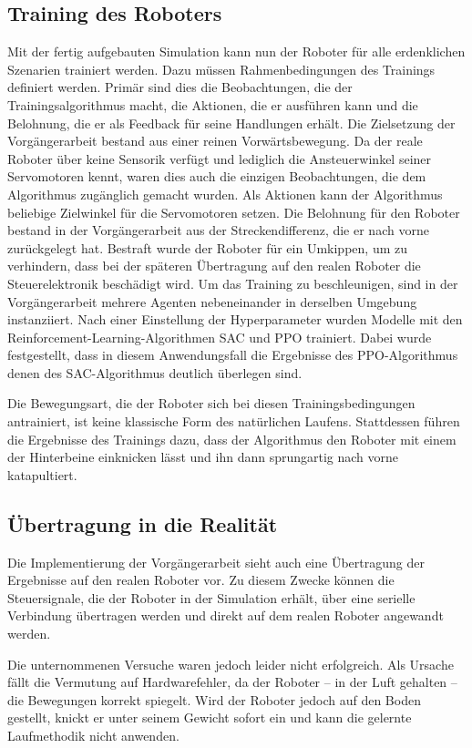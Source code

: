 \subsection{Training des Roboters}
Mit der fertig aufgebauten Simulation kann nun der Roboter für alle erdenklichen Szenarien trainiert werden.
Dazu müssen Rahmenbedingungen des Trainings definiert werden.
Primär sind dies die Beobachtungen, die der Trainingsalgorithmus macht, die Aktionen, die er ausführen kann und die Belohnung, die er als Feedback für seine Handlungen erhält.
Die Zielsetzung der Vorgängerarbeit bestand aus einer reinen Vorwärtsbewegung.
Da der reale Roboter über keine Sensorik verfügt und lediglich die Ansteuerwinkel seiner Servomotoren kennt, waren dies auch die einzigen Beobachtungen, die dem Algorithmus zugänglich gemacht wurden.
Als Aktionen kann der Algorithmus beliebige Zielwinkel für die Servomotoren setzen.
Die Belohnung für den Roboter bestand in der Vorgängerarbeit aus der Streckendifferenz, die er nach vorne zurückgelegt hat.
Bestraft wurde der Roboter für ein Umkippen, um zu verhindern, dass bei der späteren Übertragung auf den realen Roboter die Steuerelektronik beschädigt wird.
Um das Training zu beschleunigen, sind in der Vorgängerarbeit mehrere Agenten nebeneinander in derselben Umgebung instanziiert.
Nach einer Einstellung der Hyperparameter wurden Modelle mit den Reinforcement-Learning-Algorithmen SAC und PPO trainiert.
Dabei wurde festgestellt, dass in diesem Anwendungsfall die Ergebnisse des PPO-Algorithmus denen des SAC-Algorithmus deutlich überlegen sind. \cite[48]{waidner.2020}

Die Bewegungsart, die der Roboter sich bei diesen Trainingsbedingungen antrainiert, ist keine klassische Form des natürlichen Laufens.
Stattdessen führen die Ergebnisse des Trainings dazu, dass der Algorithmus den Roboter mit einem der Hinterbeine einknicken lässt und ihn dann sprungartig nach vorne katapultiert. \cite[51]{waidner.2020}

\subsection{Übertragung in die Realität}
Die Implementierung der Vorgängerarbeit sieht auch eine Übertragung der Ergebnisse auf den realen Roboter vor.
Zu diesem Zwecke können die Steuersignale, die der Roboter in der Simulation erhält, über eine serielle Verbindung übertragen werden und direkt auf dem realen Roboter angewandt werden.

Die unternommenen Versuche waren jedoch leider nicht erfolgreich.
Als Ursache fällt die Vermutung auf Hardwarefehler, da der Roboter -- in der Luft gehalten -- die Bewegungen korrekt spiegelt.
Wird der Roboter jedoch auf den Boden gestellt, knickt er unter seinem Gewicht sofort ein und kann die gelernte Laufmethodik nicht anwenden. \cite[58]{waidner.2020}


